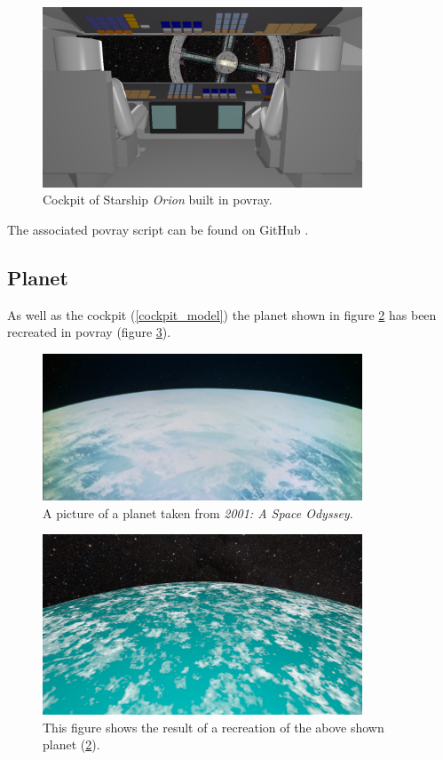 \begin{figure}[ht]
	\centering
	\includegraphics[width=0.85\textwidth]{images/scene19587.png}
	\caption{Cockpit of Starship \textit{Orion} built in povray.}
	\label{cockpit_povray}
\end{figure}

The associated povray script can be found on GitHub \cite{Quving}.

\newpage
\subsection{Planet}
As well as the cockpit (\ref{cockpit_model}) the planet shown in figure \ref{planet_original} has been recreated in povray (figure \ref{planet_povray}).
\begin{figure}[ht]
	\centering
	\includegraphics[width=0.85\textwidth]{images/original_planet.png}
	\caption{A picture of a planet taken from \textit{2001: A Space Odyssey}.}
	\label{planet_original}
\end{figure}

\begin{figure}[ht]
	\centering
	\includegraphics[width=0.85\textwidth]{images/scene04_05.jpg}
	\caption{This figure shows the result of a recreation of the above shown planet (\ref{planet_original}).}
	\label{planet_povray}
\end{figure}

